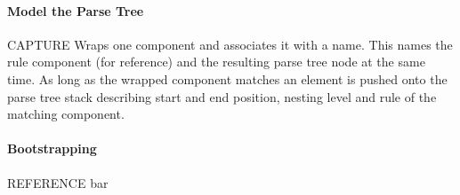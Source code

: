 \documentclass[10pt,a4paper]{article}
\begin{document}
\paragraph{Model the Parse Tree}
\begin{rulelist}
\item[CAPTURE] Wraps one component and associates it with a name. This names the rule component (for reference) and the resulting parse tree node at the same time. As long as the wrapped component matches an element is pushed onto the parse tree stack describing start and end position, nesting level and rule of the matching component.
\end{rulelist}

\paragraph{Bootstrapping}
\begin{rulelist}
\item[REFERENCE] bar
\end{rulelist}
\end{document}
